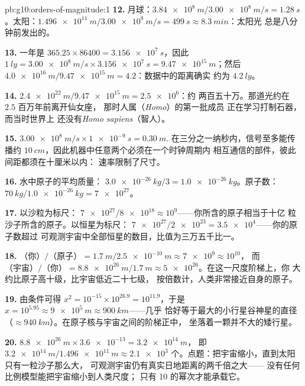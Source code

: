 \begin{solution}{pb:g10:orders-of-magnitude:1}
\textbf{12.} 月球：$\qty{3.84e8}{m}/\qty{3.00e8}{m/s} =
\qty{1.28}{s}$。太阳：$\qty{1.496e11}{m}/\qty{3.00e8}{m/s} =
\qty{499}{s} \approx \qty{8.3}{min}$：太阳光
总是八分钟前发出的。

\textbf{13.} 一年是 $365.25 \times 86400 = \qty{3.156e7}{s}$，因此
$\qty{1}{ly} = \qty{3.00e8}{m/s} \times \qty{3.156e7}{s}
= \qty{9.47e15}{m}$；然后
$\qty{4.0e16}{m}/\qty{9.47e15}{m} = 4.2$：数据中的距离确实
约为 $\qty{4.2}{ly}$。

\textbf{14.} $\qty{2.4e22}{m}/\qty{9.47e15}{m} = \num{2.5e6}$：约
两百五十万。那道光约在 $2.5$ 百万年前离开仙女座，
那时人属（\emph{Homo}）的第一批成员
正在学习打制石器，而当时世界上
还没有\emph{Homo sapiens}（智人）。

\textbf{15.} $\qty{3.00e8}{m/s} \times \qty{1e-9}{s} = \qty{0.30}{m}$.
在三分之一纳秒内，信号至多能传播约
$\qty{10}{cm}$，因此机器中任意两个必须在一个时钟周期内
相互通信的部件，彼此间距都须在十厘米以内：
速率限制了尺寸。

\textbf{16.} 水中原子的平均质量：
$\qty{3.0e-26}{kg}/3 = \qty{1.0e-26}{kg}$。原子数：
$\qty{70}{kg}/\qty{1.0e-26}{kg} = \num{7e27}$。

\textbf{17.} 以沙粒为标尺：
$\num{7e27}/\num{8e18} \approx 10^{9}$——你所含的原子相当于十亿
粒沙子所含的原子。以恒星为标尺：
$\num{7e27}/\num{2e23} = \num{3.5e4}$——你的原子数超过
可观测宇宙中全部恒星的数目，比值为三万五千比一。

\textbf{18.} $\text{（你）}/\text{（原子）} =
\qty{1.7}{m}/\qty{2.5e-10}{m} \approx \num{7e9} \approx 10^{10}$，
而 $\text{（宇宙）}/\text{（你）} =
\qty{8.8e26}{m}/\qty{1.7}{m} \approx \num{5e26}$。在这一尺度阶梯上，你
大约比原子高十级，比宇宙低近二十七级，
按倍数计，人类非常接近自身的原子。

\textbf{19.} 由条件可得
$x^{2} = 10^{-15} \times 10^{26.9} = 10^{11.9}$，于是
$x = 10^{5.95} \approx \qty{9e5}{m} \approx \qty{900}{km}$——几乎
恰好等于最大的小行星谷神星的直径
（$\approx \qty{940}{km}$）。在原子核与宇宙之间的阶梯正中，
坐落着一颗并不大的矮行星。

\textbf{20.} $\qty{8.8e26}{m} \times \num{3.6e-13} = \qty{3.2e14}{m}$，
即 $\qty{3.2e14}{m}/\qty{1.496e11}{m} \approx \num{2.1e3}$
个。点题：把宇宙缩小，直到太阳只有一粒沙子那么大，
可观测宇宙仍有真实日地距离的两千倍之大——
没有任何比例模型能把宇宙缩小到人类尺度；
只有 10 的幂次才能承载它。
\end{solution}

